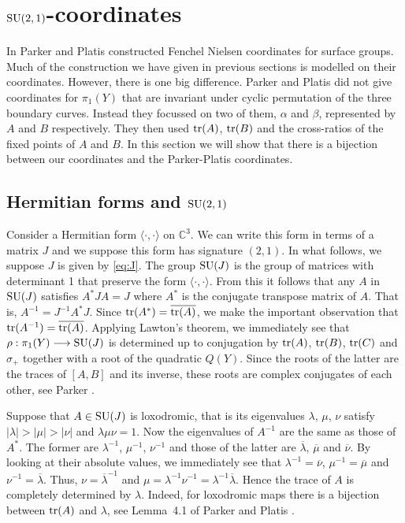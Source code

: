 \documentclass[11pt]{amsart}
\numberwithin{equation}{section}
\begin{document}
\bigskip

\section{${\rm SU}(2,1)$-coordinates}\label{sec:SU(2,1)}

In \cite{PP} Parker and Platis constructed Fenchel Nielsen coordinates for surface groups. Much of the construction
we have given in previous sections is modelled on their coordinates. However, there is one big difference. Parker and Platis
did not give coordinates for $\pi_1(Y)$ that are invariant under cyclic permutation of the three boundary curves.
Instead they focussed on two of them, $\alpha$ and $\beta$, represented by $A$ and $B$ respectively. They then used
${\rm tr}(A)$, ${\rm tr}(B)$ and the cross-ratios of the fixed points of $A$ and $B$. In this section we will show
that there is a bijection between our coordinates and the Parker-Platis coordinates.

\subsection{Hermitian forms and ${\rm SU}(2,1)$}

Consider a Hermitian form $\langle \cdot, \cdot \rangle$ on ${\mathbb C}^3$. We can write this form in terms of a matrix
$J$ and we suppose this form has signature $(2,1)$. In what follows, we suppose $J$ is given by \eqref{eq:J}. The group
${\rm SU}(J)$ is the group of matrices with determinant 1 that preserve the form $\langle \cdot,\cdot\rangle$. From this
it follows that any $A$ in ${\rm SU}(J)$ satisfies $A^*JA=J$ where $A^*$ is the conjugate transpose matrix of $A$. 
That is, $A^{-1}=J^{-1}A^*J$. Since ${\rm tr}(A^*)=\overline{{\rm tr}(A)}$, we make
the important observation that ${\rm tr}(A^{-1})=\overline{{\rm tr}(A)}$. Applying Lawton's theorem, we immediately
see that $\rho:\pi_1(Y)\longrightarrow {\rm SU}(J)$ is determined up to conjugation by 
${\rm tr}(A)$, ${\rm tr}(B)$, ${\rm tr}(C)$ and $\sigma_+$ together with a root of the quadratic $Q(Y)$. Since the roots
of the latter are the traces of $[A,B]$ and its inverse, these roots are complex conjugates of each other, see
Parker \cite{Par}.

Suppose that $A\in{\rm SU}(J)$ is loxodromic, that is its eigenvalues $\lambda$, $\mu$, $\nu$ satisfy 
$|\lambda|>|\mu|>|\nu|$ and $\lambda\mu\nu=1$. Now the eigenvalues of $A^{-1}$ are the same as those
of $A^*$. The former are $\lambda^{-1}$, $\mu^{-1}$, $\nu^{-1}$ and those of the latter are 
$\overline{\lambda}$, $\overline{\mu}$ and $\overline{\nu}$. By looking at their absolute values, we immediately
see that $\lambda^{-1}=\overline{\nu}$, $\mu^{-1}=\overline{\mu}$ and $\nu^{-1}=\overline{\lambda}$. Thus,
$\nu=\overline{\lambda}^{-1}$ and $\mu=\lambda^{-1}\nu^{-1}=\lambda^{-1}\overline{\lambda}$. Hence the
trace of $A$ is completely determined by $\lambda$. Indeed, for loxodromic maps there is a bijection between 
${\rm tr}(A)$ and $\lambda$, see Lemma~4.1 of Parker and Platis \cite{PP}.
\end{document}
